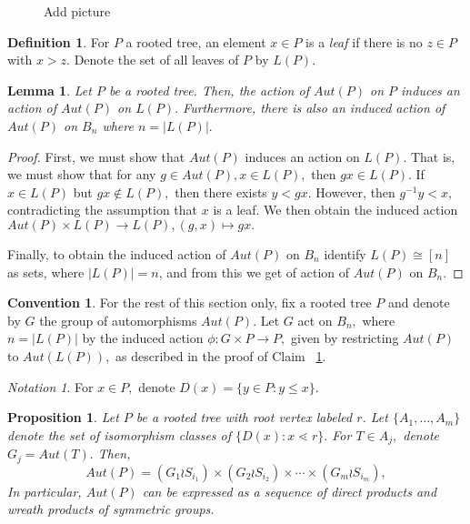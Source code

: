 \documentclass[10 pt]{amsart}
\theoremstyle{plain}
\newtheorem{prop}[thm]{Proposition}
\newtheorem{lem}[thm]{Lemma}
\theoremstyle{definition}
\newtheorem{defn}[thm]{Definition}
\newtheorem{convention}[thm]{Convention}
\theoremstyle{remark}
\newtheorem{note}[thm]{Notation}
\numberwithin{equation}{section}
\begin{document}
\begin{figure}[h!]
Add picture
\caption{\label{fig:tree2}}
\end{figure}

\begin{defn}
For $P$ a rooted tree, an element $x \in P$ is a {\it leaf} if there is no $z \in P$ with $x > z.$ Denote the set of all leaves of $P$ by $L(P).$
\end{defn}

\begin{lem}
\label{lem:induced_tree_action}
Let $P$ be a rooted tree. Then, the action of $Aut(P)$ on $P$ induces an action of $Aut(P)$ on $L(P).$ Furthermore, there is also an induced action of $Aut(P)$ on $B_n$ where $n = |L(P)|.$ 
\end{lem}
\begin{proof}
First, we must show that $Aut(P)$ induces an action on $L(P).$ That is, we must show that for any $g \in Aut(P),x \in L(P),$ then $gx \in L(P).$ If $x \in L(P)$ but $gx \notin L(P),$ then there exists $y < gx.$ However, then $g^{-1}y < x,$ contradicting the assumption that $x$ is a leaf. We then obtain the induced action $Aut(P)\times L(P) \rightarrow L(P),(g,x)\mapsto gx.$

Finally, to obtain the induced action of $Aut(P)$ on $B_n$ identify $L(P) \cong [n]$ as sets, where $|L(P)| = n$, and from this we get of action of $Aut(P)$ on $B_n.$
\end{proof}

\begin{convention}
For the rest of this section only, fix a rooted tree $P$ and denote by $G$ the group of automorphisms $Aut(P).$ Let $G$ act on $B_n,$ where $n = |L(P)|$ by the induced action $\phi:G \times P \rightarrow P,$ given by restricting $Aut(P)$ to $Aut(L(P)),$ as described in the proof of Claim ~\ref{lem:induced_tree_action}.
\end{convention}

\begin{note}
For $x \in P,$ denote $D(x) = \{y \in P: y \leq x\}.$
\end{note}
\begin{prop}
\label{prop:automorphism_trees}
Let $P$ be a rooted tree with root vertex labeled $r$. Let $\{A_1,\ldots,A_m\}$ denote the set of isomorphism classes of $\{D(x):x\lessdot r\}.$ For $T \in A_j,$ denote $G_j = Aut(T).$ Then, 
\begin{equation}
\label{eq:level_expansion}
Aut(P) = (G_1 \wr S_{i_1}) \times (G_2 \wr S_{i_2}) \times \cdots \times (G_m\wr S_{i_m}),
\end{equation}
In particular, $Aut(P)$ can be expressed as a sequence of direct products and wreath products of symmetric groups.
\end{prop}
\end{document}
